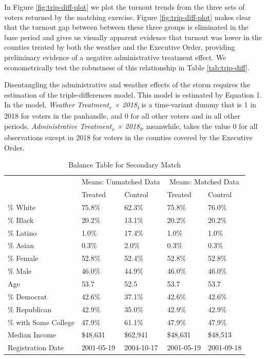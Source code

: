 \documentclass[
  12pt,
]{article}
\begin{document}
In Figure \ref{fig:trip-diff-plot} we plot the turnout trends from the three sets of voters returned by the matching exercise. Figure \ref{fig:trip-diff-plot} makes clear that the turnout gap between between these three groups is eliminated in the base period and gives us visually apparent evidence that turnout was lower in the counties treated by both the weather and the Executive Order, providing preliminary evidence of a negative administrative treatment effect. We econometrically test the robustness of this relationship in Table \ref{tab:trip-diff}.

Disentangling the administrative and weather effects of the storm requires the estimation of the triple-differences model. This model is estimated by Equation 1. In the model, \emph{Weather Treatment\textsubscript{c} × 2018\textsubscript{t}} is a time-variant dummy that is 1 in 2018 for voters in the panhandle, and 0 for all other voters and in all other periods. \emph{Administrative Treatment\textsubscript{c} × 2018\textsubscript{t}}, meanwhile, takes the value 0 for all observations except in 2018 for voters in the counties covered by the Executive Order.

\begin{singlespace}
\begin{table}[!h]

\caption{\label{tab:balance-tab-ll2}\label{tab:balance-secondary} Balance Table for Secondary Match}
\centering
\begin{tabular}[t]{lllll}
\toprule
\multicolumn{1}{c}{ } & \multicolumn{2}{c}{Means: Unmatched Data} & \multicolumn{2}{c}{Means: Matched Data} \\
\cmidrule(l{3pt}r{3pt}){2-3} \cmidrule(l{3pt}r{3pt}){4-5}
 & Treated & Control & Treated & Control\\
\midrule
\% White & 75.8\% & 62.3\% & 75.8\% & 76.0\%\\
\% Black & 20.2\% & 13.1\% & 20.2\% & 20.2\%\\
\% Latino & 1.0\% & 17.4\% & 1.0\% & 1.0\%\\
\% Asian & 0.3\% & 2.0\% & 0.3\% & 0.3\%\\
\% Female & 52.8\% & 52.4\% & 52.8\% & 52.8\%\\
\% Male & 46.0\% & 44.9\% & 46.0\% & 46.0\%\\
Age & 53.7 & 52.5 & 53.7 & 53.7\\
\% Democrat & 42.6\% & 37.1\% & 42.6\% & 42.6\%\\
\% Republican & 42.9\% & 35.0\% & 42.9\% & 42.9\%\\
\% with Some College & 47.9\% & 61.1\% & 47.9\% & 47.9\%\\
Median Income & \$48,631 & \$62,941 & \$48,631 & \$48,513\\
Registration Date & 2001-05-19 & 2004-10-17 & 2001-05-19 & 2001-09-18\\
\bottomrule
\end{tabular}
\end{table}
\end{singlespace}
\end{document}
